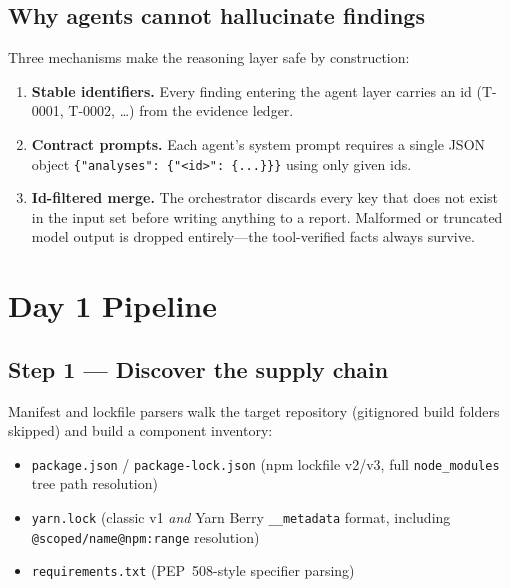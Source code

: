 \documentclass[11pt,a4paper]{article}
\begin{document}
\subsection{Why agents cannot hallucinate findings}

Three mechanisms make the reasoning layer safe by construction:

\begin{enumerate}[itemsep=2pt]
  \item \textbf{Stable identifiers.} Every finding entering the agent layer carries an
        id (T-0001, T-0002, \dots) from the evidence ledger.
  \item \textbf{Contract prompts.} Each agent's system prompt requires a single JSON
        object \texttt{\{"analyses": \{"<id>": \{...\}\}\}} using only given ids.
  \item \textbf{Id-filtered merge.} The orchestrator discards every key that does not
        exist in the input set before writing anything to a report. Malformed or
        truncated model output is dropped entirely---the tool-verified facts always
        survive.
\end{enumerate}

\section{Day 1 Pipeline}

\subsection{Step 1 --- Discover the supply chain}

Manifest and lockfile parsers walk the target repository (gitignored build folders
skipped) and build a component inventory:

\begin{itemize}[itemsep=2pt]
  \item \texttt{package.json} / \texttt{package-lock.json} (npm lockfile v2/v3, full
        \texttt{node\_modules} tree path resolution)
  \item \texttt{yarn.lock} (classic v1 \emph{and} Yarn Berry \texttt{\_\_metadata}
        format, including \texttt{@scoped/name@npm:range} resolution)
  \item \texttt{requirements.txt} (PEP~508-style specifier parsing)
\end{itemize}
\end{document}
